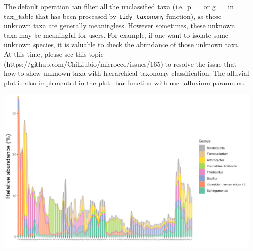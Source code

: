 \documentclass[
]{book}
\newenvironment{Shaded}{\begin{snugshade}}{\end{snugshade}}
\newcommand{\AttributeTok}[1]{\textcolor[rgb]{0.77,0.63,0.00}{#1}}
\newcommand{\CommentTok}[1]{\textcolor[rgb]{0.56,0.35,0.01}{\textit{#1}}}
\newcommand{\ConstantTok}[1]{\textcolor[rgb]{0.00,0.00,0.00}{#1}}
\newcommand{\DecValTok}[1]{\textcolor[rgb]{0.00,0.00,0.81}{#1}}
\newcommand{\FunctionTok}[1]{\textcolor[rgb]{0.00,0.00,0.00}{#1}}
\newcommand{\NormalTok}[1]{#1}
\newcommand{\OtherTok}[1]{\textcolor[rgb]{0.56,0.35,0.01}{#1}}
\newcommand{\SpecialCharTok}[1]{\textcolor[rgb]{0.00,0.00,0.00}{#1}}
\newcommand{\StringTok}[1]{\textcolor[rgb]{0.31,0.60,0.02}{#1}}
\begin{document}
The default operation can filter all the unclassified taxa (i.e.~p\_\_ or g\_\_ in tax\_table that has been processed by \texttt{tidy\_taxonomy} function),
as those unknown taxa are generally meaningless.
However sometimes, these unknown taxa may be meaningful for users.
For example, if one want to isolate some unknown species, it is valuable to check the abundance of those unknown taxa.
At this time, please see this topic (\url{https://github.com/ChiLiubio/microeco/issues/165}) to resolve the issue that how to show unknown taxa with hierarchical taxonomy classification.
The alluvial plot is also implemented in the plot\_bar function with use\_alluvium parameter.

\begin{Shaded}
\end{Shaded}

\begin{center}\includegraphics[width=20in]{Images/trans_abund_bar_allu} \end{center}
\end{document}
